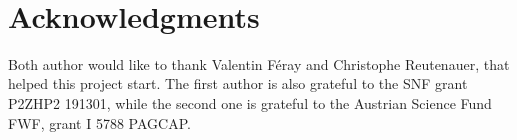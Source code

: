 \documentclass[12pt, reqno]{amsart}
\theoremstyle{definition}
\begin{document}
\

\section*{Acknowledgments}

Both author would like to thank Valentin F\'eray and Christophe Reutenauer, that helped this project start.
The first author is also grateful to the SNF grant P2ZHP2 191301, while the second one is grateful to the Austrian Science Fund FWF, grant I
5788 PAGCAP.




\end{document}
